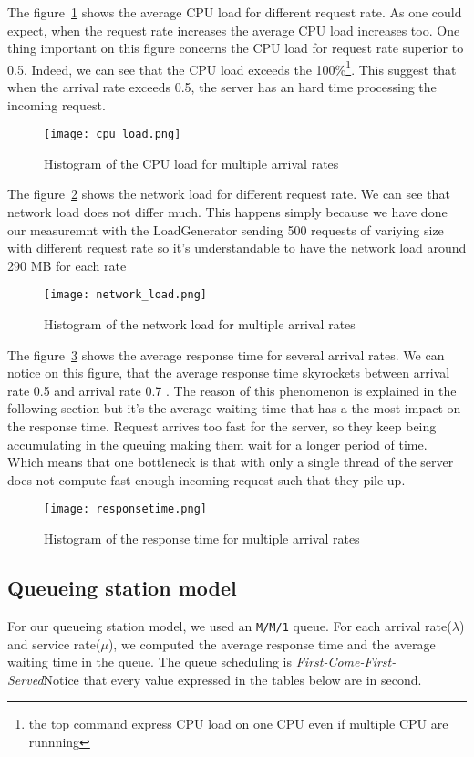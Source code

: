 The figure~\ref{fig:histocpu} shows the average CPU load for different request rate. As one could
expect, when the request rate increases the average CPU load increases too. One thing important
on this figure concerns the CPU load for request rate superior to 0.5. Indeed, we can see that the
CPU load exceeds the 100\%\footnote{the top command express CPU load on one CPU even if multiple
CPU are runnning}. This suggest that when the arrival rate exceeds 0.5, the server has an hard time
processing the incoming request. 
\begin{figure}[!ht]
    \centering
    \texttt{[image: cpu\_load.png]}
    \caption{Histogram of the CPU load for multiple arrival rates}
    \label{fig:histocpu}
\end{figure}
The figure~\ref{fig:histonetwork} shows the network load for different request rate. We can see that
network load does not differ much. This happens simply because we have done our measuremnt with the
LoadGenerator sending 500 requests of variying size with different request rate so it's understandable to have the network load around 290 MB for each rate
\begin{figure}[!ht]
    \centering
    \texttt{[image: network\_load.png]}
    \caption{Histogram of the network load for multiple arrival rates}
    \label{fig:histonetwork}
\end{figure}

The figure~\ref{fig:historesponse} shows the average response time for several arrival rates.
We can notice on this figure, that the average response time skyrockets between arrival rate
0.5 and arrival rate 0.7 . The reason of this phenomenon is explained in the following section but
it's the average waiting time that has a the most impact on the response time. Request arrives too fast
for the server, so they keep being accumulating in the queuing making them wait for a longer period
of time. Which means that one bottleneck is that with only a single thread of the server does 
not compute fast enough incoming request such that they pile up.
\begin{figure}[!ht]
    \centering
    \texttt{[image: responsetime.png]}
    \caption{Histogram of the response time for multiple arrival rates}
    \label{fig:historesponse}
\end{figure}

\subsection{Queueing station model}
\label{sub:Queueing station model}
For our queueing station model, we used an \texttt{M/M/1} queue. For each
arrival rate($\lambda$) and service rate($\mu$), we computed the
average response time and the average waiting time in the queue. The queue 
scheduling is \textit{First-Come-First-Served}Notice that
every value expressed in the tables below are in second.


